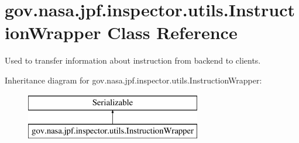 \hypertarget{classgov_1_1nasa_1_1jpf_1_1inspector_1_1utils_1_1_instruction_wrapper}{}\section{gov.\+nasa.\+jpf.\+inspector.\+utils.\+Instruction\+Wrapper Class Reference}
\label{classgov_1_1nasa_1_1jpf_1_1inspector_1_1utils_1_1_instruction_wrapper}


Used to transfer information about instruction from backend to clients.  


Inheritance diagram for gov.\+nasa.\+jpf.\+inspector.\+utils.\+Instruction\+Wrapper\+:\begin{figure}[H]
\begin{center}
\leavevmode
\includegraphics[height=2.000000cm]{classgov_1_1nasa_1_1jpf_1_1inspector_1_1utils_1_1_instruction_wrapper}
\end{center}
\end{figure}
